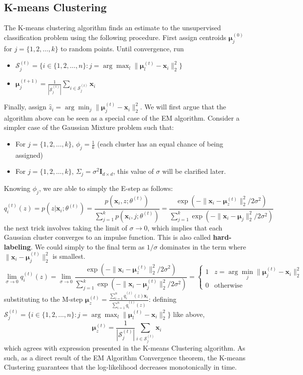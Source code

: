 \subsection{K-means Clustering}
The K-means clustering algorithm \cite{kmeans} finds an estimate to the unsupervised classification problem using the following procedure. First assign centroids $\boldsymbol{\mu}_j^{(0)}$ for $j=\{1,2,\dots,k\}$ to random points. Until convergence, run
\begin{itemize}
    \item $\mathcal{S}_j^{(t)} = \{i\in\{1,2,\dots,n\}:j=\arg\max_l\|\boldsymbol{\mu}_l^{(t)}-\mathbf{x}_i\|_2^2\}$
    \item $\boldsymbol{\mu}_j^{(t+1)}=\frac{1}{|\mathcal{S}_j^{(t)}|}\sum_{i\in \mathcal{S}_j^{(t)}} \mathbf{x}_i$
\end{itemize}
Finally, assign $\hat{z}_i=\arg\min_j\|\boldsymbol{\mu}_j^{(t)}-\mathbf{x}_i\|_2^2$. We will first argue that the algorithm above can be seen as a special case of the EM algorithm. Consider a simpler case of the Gaussian Mixture problem such that:
\begin{itemize}
    \item For $j=\{1,2,\dots,k\}$, $\phi_j=\frac{1}{k}$ (each cluster has an equal chance of being assigned)
    \item For $j=\{1,2,\dots,k\}$, $\Sigma_j=\sigma^2\mathbf{I}_{d\times d}$, this value of $\sigma$ will be clarified later.
\end{itemize}
Knowing $\phi_j$, we are able to simply the E-step as follows:
\[
    q_i^{(t)}(z) = p(z|\mathbf{x}_i;\theta^{(t)}) = \frac{p(\mathbf{x}_i,z;\theta^{(t)})}{\sum_{j=1}^k p(\mathbf{x}_i,j;\theta^{(t)})} = \frac{\exp(-\|\mathbf{x}_i-\boldsymbol{\mu}^{(t)}_z\|_2^2/2\sigma^2)}{\sum_{j=1}^k \exp(-\|\mathbf{x}_i-\boldsymbol{\mu}_j\|_2^2/2\sigma^2)}
\]
the next trick involves taking the limit of $\sigma\to0$, which implies that each Gaussian cluster converges to an impulse function. This is also called \textbf{hard-labeling}. We could simply to the final term as $1/\sigma$ dominates in the term where $\|\mathbf{x}_i-\boldsymbol{\mu}^{(t)}_j\|_2^2$ is smallest.
\[
\lim_{\sigma\rightarrow0} q_i^{(t)}(z) = \lim_{\sigma\rightarrow0} \frac{\exp(-\|\mathbf{x}_i-\boldsymbol{\mu}^{(t)}_z\|_2^2/2\sigma^2)}{\sum_{j=1}^k \exp(-\|\mathbf{x}_i-\boldsymbol{\mu}^{(t)}_j\|_2^2/2\sigma^2)} = \begin{cases}
    1 & z = \arg\min_j\|\boldsymbol{\mu}_j^{(t)}-\mathbf{x}_i\|_2^2 \\
    0 & \text{otherwise}
\end{cases}
\]
substituting to the M-step $\boldsymbol{\mu}_z^{(t)} = \frac{\sum_{i=1}^n q_i^{(t)}(z) \mathbf{x}_i}{\sum_{i=1}^n q_i^{(t)}(z)}$: defining $\mathcal{S}_j^{(t)} = \{i\in\{1,2,\dots,n\}:j=\arg\max_l\|\boldsymbol{\mu}_l^{(t)}-\mathbf{x}_i\|_2^2\}$ like above,
\[
    \boldsymbol{\mu}_z^{(t)} = \frac{1}{|\mathcal{S}_j^{(t)}|}\sum_{i\in \mathcal{S}_j^{(t)}} \mathbf{x}_i
\]
which agrees with expression presented in the K-means Clustering algorithm. As such, as a direct result of the EM Algorithm Convergence theorem, the K-means Clustering guarantees that the log-likelihood decreases monotonically in time.

